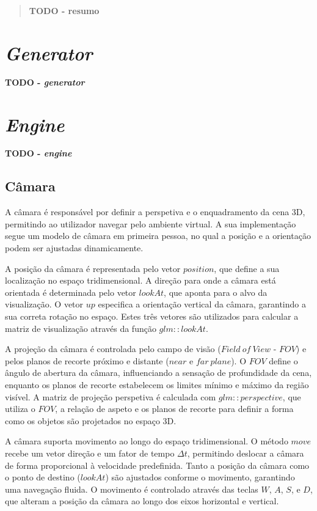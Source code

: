 \documentclass[12pt, a4paper]{article}
\begin{document}
\pagebreak

\begin{abstract}
    \textbf{\color{red} TODO - resumo}
\end{abstract}

\section{\emph{Generator}}

\textbf{\color{red} TODO - \emph{generator}}

\section{\emph{Engine}}

\textbf{\color{red} TODO - \emph{engine}}

\subsection{Câmara}

A câmara é responsável por definir a perspetiva e o enquadramento da cena 3D, permitindo ao
utilizador navegar pelo ambiente virtual. A sua implementação segue um modelo de câmara em
primeira pessoa, no qual a posição e a orientação podem ser ajustadas dinamicamente.

A posição da câmara é representada pelo vetor $position$, que define a sua localização no espaço
tridimensional. A direção para onde a câmara está orientada é determinada pelo vetor $lookAt$, que
aponta para o alvo da visualização. O vetor $up$ especifica a orientação vertical da câmara,
garantindo a sua correta rotação no espaço. Estes três vetores são utilizados para calcular a
matriz de visualização através da função $glm::lookAt$.

A projeção da câmara é controlada pelo campo de visão ($Field \ of \ View$ - $FOV$) e pelos planos
de recorte próximo e distante ($near$ e $far \ plane$). O $FOV$ define o ângulo de abertura da
câmara, influenciando a sensação de profundidade da cena, enquanto os planos de recorte estabelecem
os limites mínimo e máximo da região visível. A matriz de projeção perspetiva é calculada com
$glm::perspective$, que utiliza o $FOV$, a relação de aspeto e os planos de recorte para definir a
forma como os objetos são projetados no espaço 3D.

A câmara suporta movimento ao longo do espaço tridimensional. O método $move$ recebe um vetor
direção e um fator de tempo $\Delta t$, permitindo deslocar a câmara de forma proporcional à
velocidade predefinida. Tanto a posição da câmara como o ponto de destino ($lookAt$) são ajustados
conforme o movimento, garantindo uma navegação fluida. O movimento é controlado através das teclas
$W$, $A$, $S$, e $D$, que alteram a posição da câmara ao longo dos eixos horizontal e vertical.
\end{document}
